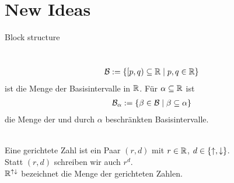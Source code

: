 \chapter{New Ideas}

Block structure

\begin{nota}\ \\
    \begin{align*}
      \mathcal{B} := \{[p,q) \subseteq \mathbb{R} \mid p,q \in \mathbb{R}\}
    \end{align*}
    ist die Menge der Basisintervalle in $\mathbb{R}$.
    Für $\alpha \subseteq \mathbb{R}$ ist
    \begin{align*}
        \mathcal{B}_{\alpha} := \{ \beta \in \mathcal{B} \mid \beta \subseteq \alpha\}
    \end{align*}
    die Menge der und durch $\alpha$ beschränkten Basisintervalle.
\end{nota}



\begin{bsp}
 \begin{align*}
  [-5.78,14\pi) &\in \B\\
  [6,4) &\notin \B\\
  [1,1) &\notin \B\\
  [-5.78,14\pi) &\in \B_{[-10,100]}\\
  [-5.78,14\pi) &\notin \B_{[0,1]}
 \end{align*}
\end{bsp}




\begin{dfn}\ \\
    Eine gerichtete Zahl ist ein Paar $(r,d)$ mit $r \in \mathbb{R}$, $d \in \{\uparrow, \downarrow\}$.\\
    Statt $(r,d)$ schreiben wir auch $r^d$.\\
    $\mathbb{R}^{{\uparrow \downarrow}}$ bezeichnet die Menge der gerichteten Zahlen.
\end{dfn}


